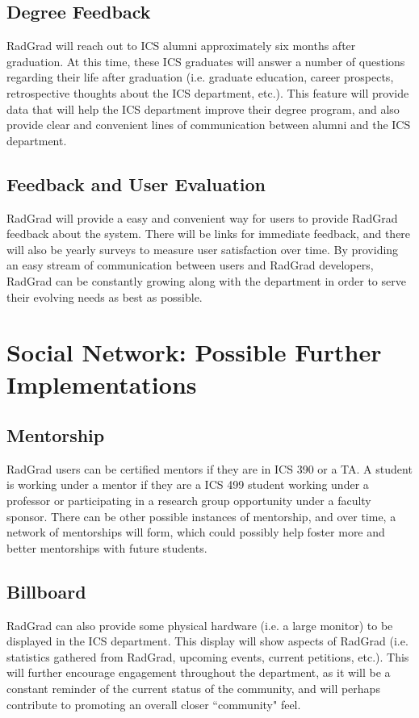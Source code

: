 \subsection{Degree Feedback}
RadGrad will reach out to ICS alumni approximately six months after graduation. At this time, these ICS graduates will answer a number of questions regarding their life after graduation (i.e. graduate education, career prospects, retrospective thoughts about the ICS department, etc.). This feature will provide data that will help the ICS department improve their degree program, and also provide clear and convenient lines of communication between alumni and the ICS department. 
\subsection{Feedback and User Evaluation}
RadGrad will provide a easy and convenient way for users to provide RadGrad feedback about the system. There will be links for immediate feedback, and there will also be yearly surveys to measure user satisfaction over time. By providing an easy stream of communication between users and RadGrad developers, RadGrad can be constantly growing along with the department in order to serve their evolving needs as best as possible.

\section{Social Network: Possible Further Implementations}
\subsection{Mentorship}
RadGrad users can be certified mentors if they are in ICS 390 or a TA. A student is working under a mentor if they are a ICS 499 student working under a professor or participating in a research group opportunity under a faculty sponsor. There can be other possible instances of mentorship, and over time, a network of mentorships will form, which could possibly help foster more and better mentorships with future students.

\subsection{Billboard}
RadGrad can also provide some physical hardware (i.e. a large monitor) to be displayed in the ICS department. This display will show aspects of RadGrad (i.e. statistics gathered from RadGrad, upcoming events, current petitions, etc.). This will further encourage engagement throughout the department, as it will be a constant reminder of the current status of the community, and will perhaps contribute to promoting an overall closer ``community" feel. 

